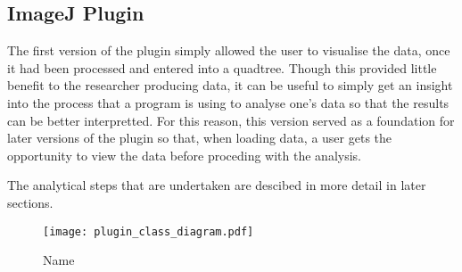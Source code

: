 
\subsection{ImageJ Plugin}
\label{sub:imagej_plugin}

The first version of the plugin simply allowed the user to visualise the data,
once it had been processed and entered into a quadtree. Though this provided
little benefit to the researcher producing data, it can be useful to simply get
an insight into the process that a program is using to analyse one's data so
that the results can be better interpretted. For this reason, this version
served as a foundation for later versions of the plugin so that, when loading
data, a user gets the opportunity to view the data before proceding with the
analysis.

The analytical steps that are undertaken are descibed in more detail in later
sections.

\begin{figure}[htpb]
	\centering
	\texttt{[image: plugin\_class\_diagram.pdf]}
	\caption{Name}
	\label{fig:name}
\end{figure}
